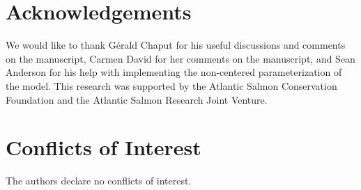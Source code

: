 \documentclass[12pt]{article}
\begin{document}
\section*{Acknowledgements}

We would like to thank G\'{e}rald Chaput for his useful discussions and
comments on the manuscript, Carmen David for her comments
on the manuscript, and Sean Anderson for his help with implementing the
non-centered parameterization of the model. This research was supported by the
Atlantic Salmon Conservation Foundation and the Atlantic Salmon Research Joint
Venture.

\section*{Conflicts of Interest}

The authors declare no conflicts of interest.
 


%
\end{document}
